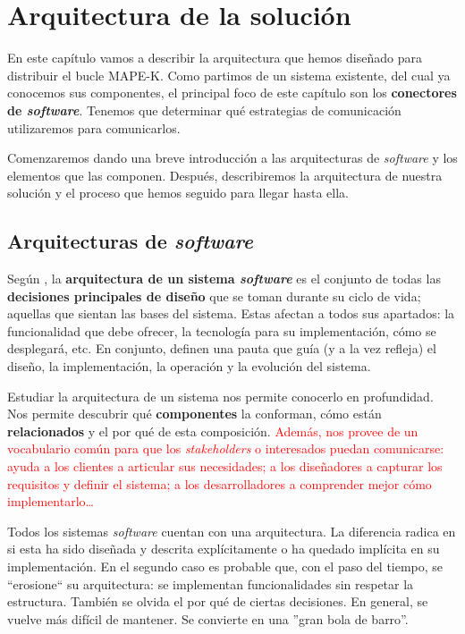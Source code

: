 \chapter{Arquitectura de la solución}

En este capítulo vamos a describir la arquitectura que hemos diseñado para distribuir el bucle MAPE-K. Como partimos de un sistema existente, del cual ya conocemos sus componentes, el principal foco de este capítulo son los \textbf{conectores de \textit{software}}. Tenemos que determinar qué estrategias de comunicación utilizaremos para comunicarlos.

Comenzaremos dando una breve introducción a las arquitecturas de \textit{software} y los elementos que las componen. Después, describiremos la arquitectura de nuestra solución y el proceso que hemos seguido para llegar hasta ella.

\section{Arquitecturas de \textit{software}}

Según \cite{taylorSoftwareArchitectureFoundations2009}, la \textbf{arquitectura de un sistema \textit{software}} es el conjunto de todas las \textbf{decisiones principales de diseño} que se toman durante su ciclo de vida; aquellas que sientan las bases del sistema. Estas afectan a todos sus apartados: la funcionalidad que debe ofrecer, la tecnología para su implementación, cómo se desplegará, etc. En conjunto, definen una pauta que guía (y a la vez refleja) el diseño, la implementación, la operación y la evolución del sistema.

Estudiar la arquitectura de un sistema nos permite conocerlo en profundidad. Nos permite descubrir qué \textbf{componentes} la conforman, cómo están \textbf{relacionados} y el por qué de esta composición. \cite{perryFoundationsStudySoftware1992} \textcolor{red}{Además, nos provee de un vocabulario común para que los \textit{stakeholders} o interesados puedan comunicarse: ayuda a los clientes a articular sus necesidades; a los diseñadores a capturar los requisitos y definir el sistema; a los desarrolladores a comprender mejor cómo implementarlo\dots}

Todos los sistemas \textit{software} cuentan con una arquitectura. La diferencia radica en si esta ha sido diseñada y descrita explícitamente o ha quedado implícita en su implementación. \cite{taylorSoftwareArchitectureFoundations2009} En el segundo caso es probable que, con el paso del tiempo, se ``erosione`` su arquitectura: se implementan funcionalidades sin respetar la estructura. También se olvida el por qué de ciertas decisiones. En general, se vuelve más difícil de mantener. Se convierte en una ''gran bola de barro''. \cite{footeBigBallMud1997}

